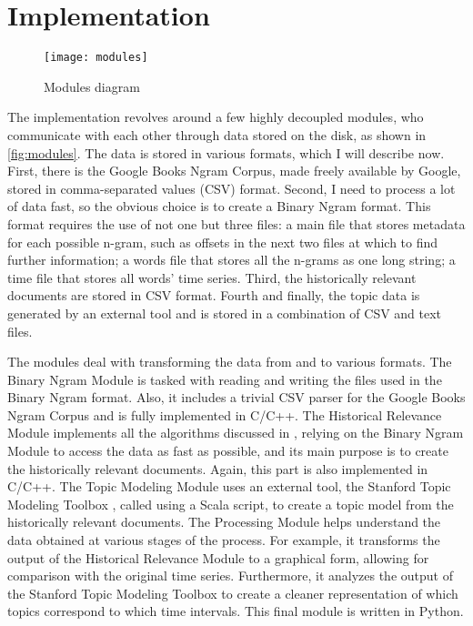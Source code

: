 \chapter{Implementation}
\label{chapter:implementation}

\begin{figure}
\centering
\texttt{[image: modules]}
\caption{Modules diagram}
\label{fig:modules}
\end{figure}

The implementation revolves around a few highly decoupled modules, who communicate with each other through data stored on the disk, as shown in \autoref{fig:modules}. The data is stored in various formats, which I will describe now. First, there is the Google Books Ngram Corpus, made freely available by Google, stored in comma-separated values (CSV) format. Second, I need to process a lot of data fast, so the obvious choice is to create a Binary Ngram format. This format requires the use of not one but three files: a main file that stores metadata for each possible n-gram, such as offsets in the next two files at which to find further information; a words file that stores all the n-grams as one long string; a time file that stores all words' time series. Third, the historically relevant documents are stored in CSV format. Fourth and finally, the topic data is generated by an external tool and is stored in a combination of CSV and text files.

The modules deal with transforming the data from and to various formats. The Binary Ngram Module is tasked with reading and writing the files used in the Binary Ngram format. Also, it includes a trivial CSV parser for the Google Books Ngram Corpus and is fully implemented in C/C++. The Historical Relevance Module implements all the algorithms discussed in , relying on the Binary Ngram Module to access the data as fast as possible, and its main purpose is to create the historically relevant documents. Again, this part is also implemented in C/C++. The Topic Modeling Module uses an external tool, the Stanford Topic Modeling Toolbox \cite{stanfordtmt}, called using a Scala script, to create a topic model from the historically relevant documents. The Processing Module helps understand the data obtained at various stages of the process. For example, it transforms the output of the Historical Relevance Module to a graphical form, allowing for comparison with the original time series. Furthermore, it analyzes the output of the Stanford Topic Modeling Toolbox to create a cleaner representation of which topics correspond to which time intervals. This final module is written in Python.
